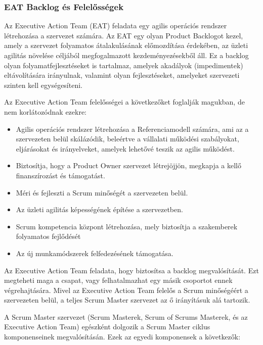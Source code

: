 \documentclass[12pt,a4paper,parskip=full]{scrartcl}
\begin{document}
\subsubsection{EAT Backlog és Felelősségek}\label{EAT-backlog-and-responsibilities}

Az Executive Action Team (EAT) feladata egy agilis operációs rendszer létrehozása a szervezet számára. Az EAT egy olyan Product Backlogot kezel, amely a szervezet folyamatos átalakulásának előmozdítása érdekében, az üzleti agilitás növelése céljából megfogalmazott kezdeményezésekből áll. Ez a backlog olyan folyamatfejlesztéseket is tartalmaz, amelyek akadályok (impedimentek) eltávolítására irányulnak, valamint olyan fejlesztéseket, amelyeket szervezeti szinten kell egységesíteni.

Az Executive Action Team felelősségei a következőket foglalják magukban, de nem korlátozódnak ezekre:

\begin{itemize}
\itemsep1pt\parskip0pt
\item
 Agilis operációs rendszer létrehozása a Referenciamodell számára, ami az a szervezeten belül skálázódik, beleértve a vállalati működési szabályokat, eljárásokat és irányelveket, amelyek lehetővé teszik az agilis működést.
\item
 Biztosítja, hogy a Product Owner szervezet létrejöjjön, megkapja a kellő finanszírozást és támogatást.
\item
 Méri és fejleszti a Scrum minőségét a szervezeten belül.
\item
 Az üzleti agilitás képességének építése a szervezetben.
\item
 Scrum kompetencia központ létrehozása, mely biztosítja a szakemberek folyamatos fejlődését
\item
 Az új munkamódszerek felfedezésének támogatása.
\end{itemize}

Az Executive Action Team feladata, hogy biztosítsa a backlog megvalósítását. Ezt megteheti maga a csapat, vagy felhatalmazhat egy másik csoportot ennek végrehajtására. Mivel az Executive Action Team felelős a Scrum minőségéért a szervezeten belül, a teljes Scrum Master szervezet az ő irányításuk alá tartozik.

A Scrum Master szervezet (Scrum Masterek, Scrum of Scrums Masterek, és az Executive Action Team) egészként dolgozik a Scrum Master ciklus komponenseinek megvalósításán. Ezek az egyedi komponensek a következők:
\end{document}
